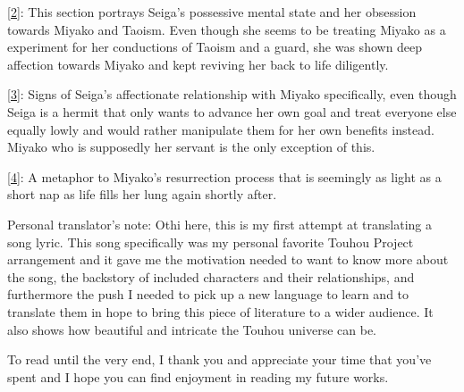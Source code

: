 \documentclass{article}
\newcommand{\tlnoteref}[1]{\hypertarget{#1tonote}{}\hyperlink{#1}{[#1]}}
\begin{document}
\tlnoteref{2}: This section portrays Seiga's possessive mental state and her obsession towards Miyako and Taoism. Even though she seems to be treating Miyako as a experiment for her conductions of Taoism and a guard, she was shown deep affection towards Miyako and kept reviving her back to life diligently.

\tlnoteref{3}: Signs of Seiga's affectionate relationship with Miyako specifically, even though Seiga is a hermit that only wants to advance her own goal and treat everyone else equally lowly and would rather manipulate them for her own benefits instead. Miyako who is supposedly her servant is the only exception of this.

\tlnoteref{4}: A metaphor to Miyako's resurrection process that is seemingly as light as a short nap as life fills her lung again shortly after.

Personal translator's note: Othi here, this is my first attempt at translating a song lyric. This song specifically was my personal favorite Touhou Project arrangement and it gave me the motivation needed to want to know more about the song, the backstory of included characters and their relationships, and furthermore the push I needed to pick up a new language to learn and to translate them in hope to bring this piece of literature to a wider audience. It also shows how beautiful and intricate the Touhou universe can be.

To read until the very end, I thank you and appreciate your time that you've spent and I hope you can find enjoyment in reading my future works.
\end{document}
